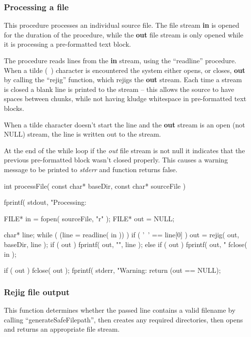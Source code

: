 \documentclass[]{article}
\begin{document}
\subsubsection{			Processing a file}

This procedure processes an individual source file.
The file stream \textbf{in} is opened for the duration of the procedure, while the \textbf{out} file stream is only opened while it is processing a pre-formatted text block.


The procedure reads lines from the \textbf{in} stream, using the ``readline'' procedure.
When a tilde (~) character is encountered the system either opens, or closes, \textbf{out} by calling the ``rejig'' function, which rejigs the \textbf{out} stream.
Each time a stream is closed a blank line is printed to the stream -- this allows the source to have spaces between chunks, while not having kludge whitespace in pre-formatted text blocks.


When a tilde character doesn't start the line and the \textbf{out} stream is an open (not NULL) stream, the line is written out to the stream.


At the end of the while loop if the \emph{out} file stream is not null it indicates that the previous pre-formatted block wasn't closed properly.
This causes a warning message to be printed to \emph{stderr} and function returns false.

\begin{verbatimtab}
int processFile( const char* baseDir, const char* sourceFile )
{
	fprintf( stdout, "Processing: %

	FILE* in   = fopen( sourceFile, "r" );
	FILE* out  = NULL;

	char* line;
	while ( (line = readline( in )) )
	{
		if ( '~' == line[0] ) {
			out = rejig( out, baseDir, line );
			if ( out ) fprintf( out, "\n", line );
		}
		else if ( out )
		{
			fprintf( out, "%
		}
	}
	fclose( in );

	if ( out )
	{
		fclose( out );
		fprintf( stderr, "Warning: %
	}
	return (out == NULL);
}

\end{verbatimtab}
\subsubsection{			Rejig file output}

This function determines whether the passed line contains a valid filename by calling ``generateSafeFilepath'', then creates any required directories, then opens and returns an appropriate file stream.
\end{document}
